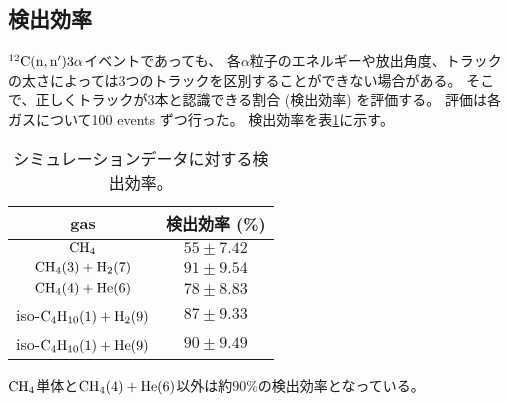 \documentclass[../master]{subfiles}
\begin{document}
\subsection{検出効率}
${}^{12}{\rm C}({\rm n},{\rm n}')3\alpha$イベントであっても、
各$\alpha$粒子のエネルギーや放出角度、トラックの太さによっては3つのトラックを区別することができない場合がある。
そこで、正しくトラックが3本と認識できる割合 (検出効率) を評価する。
評価は各ガスについて100 events ずつ行った。
検出効率を表\ref{tab::detection_efficiency}に示す。
\begin{table}
  \centering
  \caption{シミュレーションデータに対する検出効率。}
  \label{tab::detection_efficiency}
  \begin{tabular}{cc}
    \toprule
    gas & 検出効率 (\%)\\
    \midrule
    $\rm CH_{4}$ & $55 \pm 7.42$ \\
    $\rm CH_{4} (3) + H_{2} (7)$ & $91 \pm 9.54$ \\
    $\rm CH_{4} (4) + He (6)$ & $78 \pm 8.83$ \\
    iso-$\rm C_{4}H_{10} (1) + H_{2} (9)$ & $87 \pm 9.33$ \\
    iso-$\rm C_{4}H_{10} (1) + He (9)$ & $90 \pm 9.49$ \\
    \bottomrule
  \end{tabular}
\end{table}
$\rm CH_{4}$単体と$\rm CH_{4} (4) + He (6)$以外は約90\%の検出効率となっている。

\end{document}
